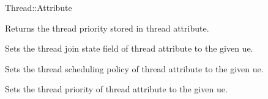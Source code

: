 \begin{classpage}{Thread::Attribute}
\begin{mandescription}
  Returns the thread priority stored in  thread attribute.

  Sets the thread join state field of  thread attribute to
  the given ue.

  Sets the thread scheduling policy of  thread attribute to
  the given ue.

  Sets the thread priority of  thread attribute to the
  given ue.
\end{mandescription}

\renewcommand{\manlayout}{\savedmanlayout}

\end{classpage}

